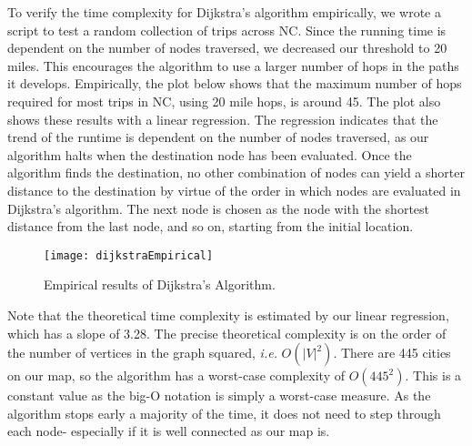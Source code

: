 \documentclass[]{../ncmathy}
\begin{document}
To verify the time complexity for Dijkstra's algorithm empirically, we wrote a script to test a random collection of trips across NC. Since the running time is dependent on the number of nodes traversed, we decreased our threshold to 20 miles. This encourages the algorithm to use a larger number of hops in the paths it develops. Empirically, the plot below shows that the maximum number of hops required for most trips in NC, using 20 mile hops, is around 45. The plot also shows these results with a linear regression. The regression indicates that the trend of the runtime is dependent on the number of nodes traversed, as our algorithm halts when the destination node has been evaluated. Once the algorithm finds the destination, no other combination of nodes can yield a shorter distance to the destination by virtue of the order in which nodes are evaluated in Dijkstra's algorithm. The next node is chosen as the node with the shortest distance from the last node, and so on, starting from the initial location.

\begin{figure}[H]
\centering\texttt{[image: dijkstraEmpirical]}
\caption{Empirical results of Dijkstra's Algorithm.}
\end{figure}

Note that the theoretical time complexity is estimated by our linear regression, which has a slope of 3.28. The precise theoretical complexity is on the order of the number of vertices in the graph squared, \textit{i.e.} $O(|V|^2)$. There are 445 cities on our map, so the algorithm has a worst-case complexity of $O(445^2)$. This is a constant value as the big-O notation is simply a worst-case measure. As the algorithm stops early a majority of the time, it does not need to step through each node- especially if it is well connected as our map is.
\end{document}
